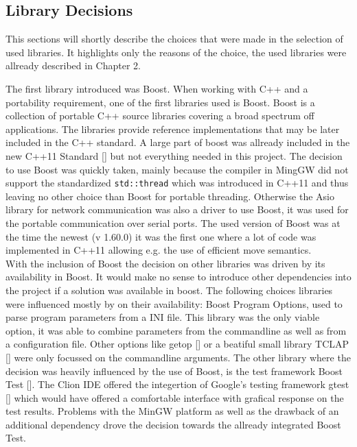 \subsection{Library Decisions}
This sections will shortly describe the choices that were made in the selection of used libraries. It highlights only the reasons of the choice, the used libraries were allready described in Chapter 2.

The first library introduced was Boost. When working with C++ and a portability requirement, one of the first libraries used is Boost. Boost is a collection of portable C++ source libraries covering a broad spectrum off applications. The libraries provide reference implementations that may be later included in the C++ standard. A large part of boost was allready included in the new C++11 Standard [] but not everything needed in this project. The decision to use Boost was quickly taken, mainly because the compiler in MingGW did not support the standardized \texttt{std::thread} which was introduced in C++11 and thus leaving no other choice than Boost for portable threading. Otherwise the Asio library for network communication was also a driver to use Boost, it was used for the portable communication over serial ports. The used version of Boost was at the time the newest (v 1.60.0) it was the first one where a lot of code was implemented in C++11 allowing e.g. the use of efficient move semantics.\\
With the inclusion of Boost the decision on other libraries was driven by its availability in Boost. It would make no sense to introduce other dependencies into the project if a solution was available in boost. The following choices libraries were influenced mostly by on their availability: Boost Program Options, used to parse program parameters from a INI file. This library was the only viable option, it was able to combine parameters from the commandline as well as from a configuration file. Other options like getop [] or a beatiful small library TCLAP [] were only focussed on the commandline arguments. The other library where the decision was heavily influenced by the use of Boost, is the test framework Boost Test []. The Clion IDE offered the integertion of Google's testing framework gtest [] which would have offered a comfortable interface with grafical response on the test results. Problems with the MinGW platform as well as the drawback of an additional dependency drove the decision towards the allready integrated Boost Test.

